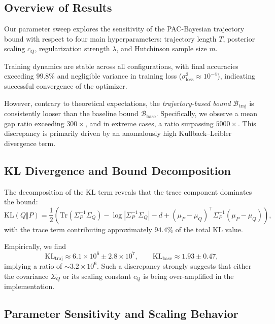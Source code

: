 \subsection{Overview of Results}

Our parameter sweep explores the sensitivity of the PAC-Bayesian trajectory bound with respect to four main hyperparameters: trajectory length $T$, posterior scaling $c_Q$, regularization strength $\lambda$, and Hutchinson sample size $m$. 

Training dynamics are stable across all configurations, with final accuracies exceeding $99.8\%$ and negligible variance in training loss ($\sigma^2_{\text{loss}} \approx 10^{-4}$), indicating successful convergence of the optimizer.

However, contrary to theoretical expectations, the \emph{trajectory-based bound} $\mathcal{B}_{\text{traj}}$ is consistently looser than the baseline bound $\mathcal{B}_{\text{base}}$. Specifically, we observe a mean gap ratio exceeding $300\times$, and in extreme cases, a ratio surpassing $5000\times$. This discrepancy is primarily driven by an anomalously high Kullback–Leibler divergence term.

\subsection{KL Divergence and Bound Decomposition}

The decomposition of the KL term reveals that the trace component dominates the bound:
\begin{equation}
    \mathrm{KL}(Q \Vert P) = \frac{1}{2} \left( \mathrm{Tr}(\Sigma_P^{-1}\Sigma_Q) - \log|\Sigma_P^{-1}\Sigma_Q| - d + (\mu_P - \mu_Q)^\top \Sigma_P^{-1}(\mu_P - \mu_Q) \right),
\end{equation}
with the trace term contributing approximately $94.4\%$ of the total KL value.

Empirically, we find
\[
\mathrm{KL}_{\text{traj}} \approx 6.1 \times 10^6 \pm 2.8 \times 10^7, \qquad 
\mathrm{KL}_{\text{base}} \approx 1.93 \pm 0.47,
\]
implying a ratio of $\sim 3.2 \times 10^6$. Such a discrepancy strongly suggests that either the covariance $\Sigma_Q$ or its scaling constant $c_Q$ is being over-amplified in the implementation.

\subsection{Parameter Sensitivity and Scaling Behavior}

